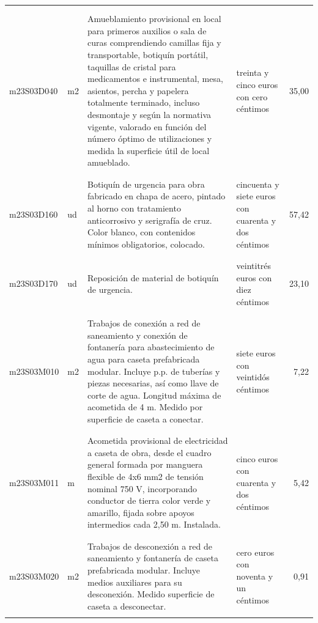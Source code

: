 \begin{supertabular}{|l|l|p{5cm}|p{3cm}|r|}
&&&&\\%
&&&&\\%
m23S03D040&m2&Amueblamiento provisional en local para primeros auxilios o sala de curas comprendiendo camillas fija y transportable, botiquín portátil, taquillas de cristal para medicamentos e instrumental, mesa, asientos, percha y papelera totalmente terminado, incluso desmontaje y según la normativa vigente, valorado en función del número óptimo de utilizaciones y medida la superficie útil de local amueblado.&treinta y cinco euros con cero céntimos&35,00\\%
&&&&\\%
&&&&\\%
m23S03D160&ud&Botiquín de urgencia para obra fabricado en chapa de acero, pintado al horno con tratamiento anticorrosivo y serigrafía de cruz. Color blanco, con contenidos mínimos obligatorios, colocado.&cincuenta y siete euros con cuarenta y dos céntimos&57,42\\%
&&&&\\%
&&&&\\%
m23S03D170&ud&Reposición de material de botiquín de urgencia.&veintitrés euros con diez céntimos&23,10\\%
&&&&\\%
&&&&\\%
m23S03M010&m2&Trabajos de conexión a red de saneamiento y conexión de fontanería para abastecimiento de agua para caseta prefabricada modular. Incluye p.p. de tuberías y piezas necesarias, así como llave de corte de agua. Longitud máxima de acometida de 4 m. Medido por superficie de caseta a conectar.&siete euros con veintidós céntimos&7,22\\%
&&&&\\%
&&&&\\%
m23S03M011&m&Acometida provisional de electricidad a caseta de obra, desde el cuadro general formada por manguera flexible de 4x6 mm2 de tensión nominal 750 V, incorporando conductor de tierra color verde y amarillo, fijada sobre apoyos intermedios cada 2,50 m. Instalada.&cinco euros con cuarenta y dos céntimos&5,42\\%
&&&&\\%
&&&&\\%
m23S03M020&m2&Trabajos de desconexión a red de saneamiento y fontanería de caseta prefabricada modular. Incluye medios auxiliares para su desconexión. Medido superficie de caseta a desconectar.&cero euros con noventa y un céntimos&0,91\\%
&&&&\\%

\end{supertabular}
